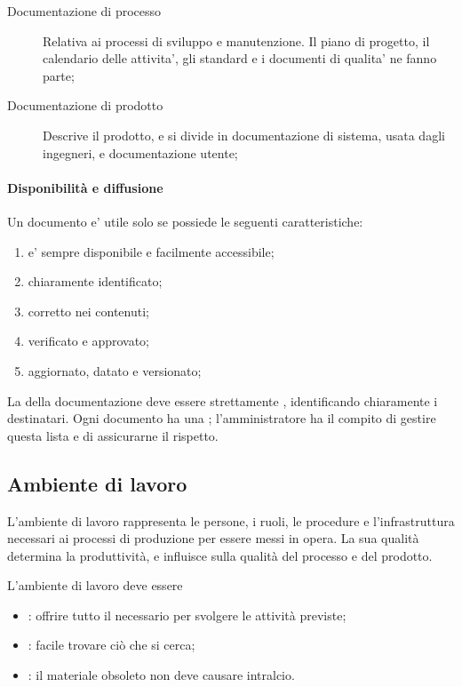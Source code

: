 \begin{description}
  \item[Documentazione di processo] Relativa ai processi di sviluppo e
    manutenzione. Il piano di progetto, il calendario delle attivita', gli
    standard e i documenti di qualita' ne fanno parte;
  \item[Documentazione di prodotto] Descrive il prodotto, e si divide in
    documentazione di sistema, usata dagli ingegneri, e documentazione utente;
\end{description}

\paragraph{Disponibilità e diffusione}
\label{par:utilita}

Un documento e' utile solo se possiede le seguenti caratteristiche:

\begin{enumerate}
	\item e' sempre disponibile e facilmente accessibile;
	\item chiaramente identificato;
	\item corretto nei contenuti;
	\item verificato e approvato;
	\item aggiornato, datato e versionato;
\end{enumerate}

La  della documentazione deve essere strettamente
, identificando chiaramente i destinatari. Ogni documento ha
una ; l'amministratore ha il compito di gestire
questa lista e di assicurarne il rispetto.

\subsection{Ambiente di lavoro}

L'ambiente di lavoro rappresenta le persone, i ruoli, le procedure e
l'infrastruttura necessari ai processi di produzione per essere messi in opera.
La sua qualità determina la produttività, e influisce sulla qualità del processo
e del prodotto.

L'ambiente di lavoro deve essere

\begin{itemize}
  \item {}: offrire tutto il necessario per svolgere le attività
    previste;
  \item {}: facile trovare ciò che si cerca;
  \item {}: il materiale obsoleto non deve causare intralcio.
\end{itemize}

